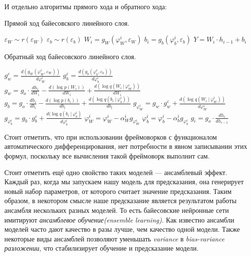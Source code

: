 И отдельно алгоритмы прямого хода и обратного хода:
\begin{algorithm}
\caption{Прямой ход байесовского линейного слоя.}
\begin{algorithmic}
    \State $\varepsilon_W \sim r(\varepsilon_W)$
    \State $\varepsilon_b \sim r(\varepsilon_b)$
    \State $W_i = g_{W}(\varphi_W^i, \varepsilon_W)$
    \State $b_i = g_{b}(\varphi_b^i, \varepsilon_b)$
    \State $Y = W_i \cdot h_{i-1} + b_i$
    \State {}
\EndProcedure
\end{algorithmic}
\end{algorithm}
\begin{algorithm}
\caption{Обратный ход байесовского линейного слоя.}
\begin{algorithmic}
    \State $g_w^\varepsilon = \frac{d(g_{W}(\varphi_W^i, \varepsilon_W))}{d \varphi_W^i}$
    \State $g_b^\varepsilon = \frac{d(g_{b}(\varphi_b^i, \varepsilon_b))}{d \varphi_b^i}$
    \State $g_w = g_o \cdot \frac{dh_i}{dW_i} - \frac{d(\log p(W_i))}{dW_i} + \frac{d(\log q(W_i\ |\ \varphi_W^i))}{dW_i}$
    \State $g_b = g_o \cdot \frac{dh_i}{db_i} - \frac{d(\log p(b_i))}{db_i} + \frac{d(\log q(b_i\ |\ \varphi_b^i))}{db_i}$
    \State $g_{\varphi_W^i} = g_w \cdot g_w^\varepsilon + \frac{d(\log q(W_i\ |\ \varphi_W^i))}{d\varphi_W^i}$
    \State $g_{\varphi_b^i} = g_b \cdot g_b^\varepsilon + \frac{d(\log q(b_i\ |\ \varphi_b^i)}{d\varphi_b^i}$
    \State $\varphi_W^i = \varphi_W^i - \alpha_W^i g_{\varphi_W^i}$
    \State $\varphi_b^i = \varphi_b^i - \alpha_b^i g_{\varphi_b^i}$
    \State $g_i = g_o \cdot \frac{dh_i}{dh_{i-1}}$
    \State {}
\EndProcedure
\end{algorithmic}
\end{algorithm}

Стоит отметить, что при использовании фреймоворков с функционалом автоматического дифференцирования, нет потребности в явном записывании этих формул,
 поскольку все вычисления такой фреймоворк выполнит сам.

Стоит отметить ещё одно свойство таких моделей --- ансамблевый эффект. Каждый раз, когда мы запускаем нашу модель для предсказания, она
 генерирует новый набор параметров, от которого считает значение предсказания. Таким образом, в некотором смысле наше предсказание является
 результатом работы ансамбля нескольких разных моделей. То есть байесовские нейронные сети имитируют \textit{ансамблевое обучение(ensemble learning)}.
 Как известно ансамбли моделей часто дают качество в разы лучше, чем качество одной модели. Также некоторые виды ансамблей позволяют уменьшать
 \textit{variance} в \textit{bias-variance разложении}, что стабилизирует обучение и предсказание модели.


